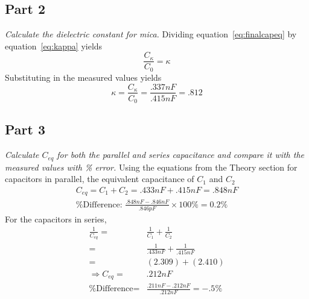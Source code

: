 \documentclass[twocolumn,english]{IEEEtran}
\theoremstyle{plain}
\theoremstyle{plain}
\begin{document}
  \subsection*{\textbf{Part 2}}
  \textit{Calculate the dielectric constant for mica.}
  Dividing equation~\ref{eq:finalcapeq} by equation~\ref{eq:kappa} yields
  \begin{equation}
   \frac{C_{\kappa}}{C_0} = \kappa
  \end{equation}
  Substituting in the measured values yields
  \begin{equation*}
   \kappa = \frac{C_{\kappa}}{C_0} = \frac{.337 nF}{.415 nF} = .812
  \end{equation*}


  \subsection*{\textbf{Part 3}}
  \textit{Calculate $C_{eq}$ for both the parallel and series capacitance and compare it with the measured values with \% error.}
  Using the equations from the Theory section for capacitors in parallel, the equivalent capacitance of $C_1$ and $C_2$
  \begin{align*}
   C_{eq} = C_1 + C_2 = .433 nF + .415 nF = .848 nF \\
   \text{\% Difference: } \frac{.848 nF - .846 nF}{.846 pF} \times 100\% = 0.2\%
  \end{align*}
  For the capacitors in series,
  \begin{align*}
  \frac{1}{C_{eq}} 	=& \frac{1}{C_1} + \frac{1}{C_2} \\
  		     	=& \frac{1}{.433 nF} + \frac{1}{.415 nF} \\
  		     	=& (2.309) + (2.410) \\
  \Rightarrow C_{eq} 	=& .212 nF \\
  \text{\% Difference} =& \frac{.211 nF - .212 nF}{.212 nF} = -.5\%
  \end{align*}
\end{document}
